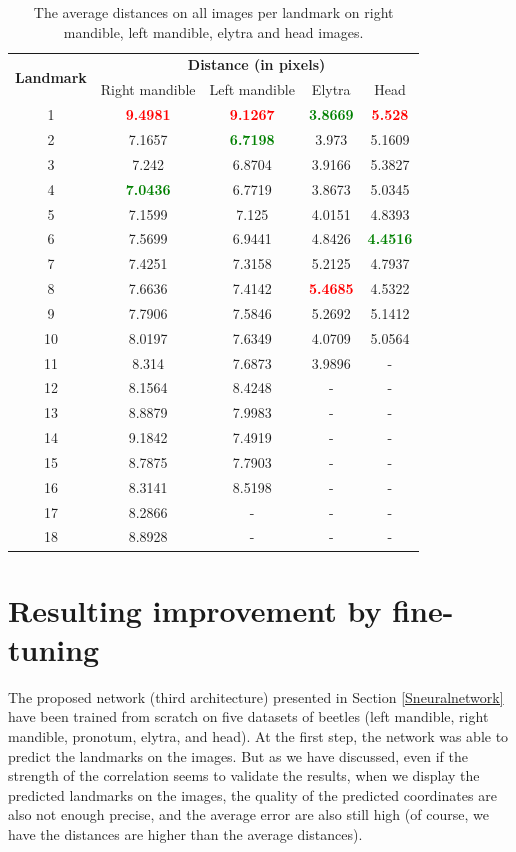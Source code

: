 \documentclass[review]{elsarticle}
\begin{document}
\begin{table}[htbp]
	\centering	
	\begin{tabular}{|c|c|c|c|c|}
		\hline
		\multirow{2}{*}{\textbf{Landmark}} & \multicolumn{4}{|c|}{\textbf{Distance (in pixels)}} \\ \cline{2-5}
		 & Right mandible & Left mandible & Elytra & Head  \\ \hline
		1 & \textcolor{red}{\textbf{9.4981}} & \textcolor{red}{\textbf{9.1267}} & \textcolor{green}{\textbf{3.8669}} & \textcolor{red}{\textbf{5.528}}  \\ \hline
2 & 7.1657 & \textcolor{green}{\textbf{6.7198}} & 3.973 & 5.1609  \\ \hline
3 & 7.242 & 6.8704 & 3.9166 & 5.3827 \\ \hline
4 & \textcolor{green}{\textbf{7.0436}} & 6.7719 & 3.8673 & 5.0345 \\ \hline
5 & 7.1599 & 7.125 & 4.0151 & 4.8393 \\ \hline
6 & 7.5699 & 6.9441 & 4.8426 & \textcolor{green}{\textbf{4.4516}} \\ \hline
7 & 7.4251 & 7.3158 & 5.2125 & 4.7937 \\ \hline
8 & 7.6636 & 7.4142 & \textcolor{red}{\textbf{5.4685}} & 4.5322 \\ \hline
9 & 7.7906 & 7.5846 & 5.2692 & 5.1412 \\ \hline
10 & 8.0197 & 7.6349 & 4.0709 & 5.0564 \\ \hline
11 & 8.314 & 7.6873 & 3.9896 & - \\ \hline
12 & 8.1564 & 8.4248 & - & - \\ \hline
13 & 8.8879 & 7.9983 & - & - \\ \hline
14 & 9.1842 & 7.4919 & - & - \\ \hline
15 & 8.7875 & 7.7903 & - & - \\ \hline
16 & 8.3141 & 8.5198 & - & - \\ \hline
17 & 8.2866 & - & - & - \\ \hline
18 & 8.8928 & - & - & - \\ \hline
	\end{tabular}
	\caption{The average distances on all images per landmark on right mandible, left mandible, elytra and head images.}
	\label{tblavg4parts}
\end{table}

\section{Resulting improvement by fine-tuning}
\label{sfineTuning}
The proposed network (third architecture) presented in Section \ref{Sneuralnetwork} have been trained from scratch on five datasets of beetles (left mandible, right mandible, pronotum, elytra, and head). At the first step, the network was able to predict the landmarks on the images. But as we have discussed, even if the strength of the correlation seems to validate the results, when we display the predicted landmarks on the images, the quality of the predicted coordinates are also not enough precise, and the average error are also still high (of course, we have the distances are higher than the average distances).
\end{document}
